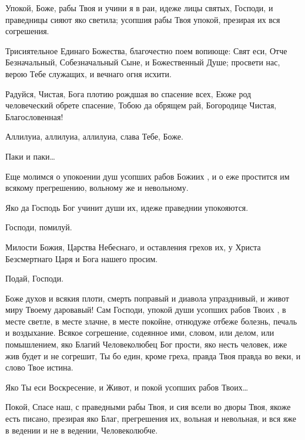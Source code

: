 \begin{mymulticols}

Упокой, Боже, рабы Твоя и учини я в раи, идеже лицы святых, Господи, и праведницы сияют яко светила; усопшия рабы Твоя упокой, презирая их вся согрешения. 

\slava 

Трисиятельное Единаго Божества, благочестно поем вопиюще: Свят еси, Отче Безначальный, Собезначальный Сыне, и Божественный Душе; просвети нас, верою Тебе служащих, и вечнаго огня исхити. 

\inyne 

Радуйся, Чистая, Бога плотию рождшая во спасение всех, Еюже род человеческий обрете спасение, Тобою да обрящем рай, Богородице Чистая, Благословенная! 

Аллилуиа, аллилуиа, аллилуиа, слава Тебе, Боже.  

 Паки и паки… 

Еще молимся о упокоении душ усопших рабов Божиих , и о еже простится им всякому прегрешению, вольному же и невольному. 

 Яко да Господь Бог учинит души их, идеже праведнии упокояются. 

 Господи, помилуй. 

Милости Божия, Царства Небеснаго, и оставления грехов их, у Христа Безсмертнаго Царя и Бога нашего просим. 

 Подай, Господи.


Боже духов и всякия плоти, смерть поправый и диавола упразднивый, и живот миру Твоему даровавый! Сам Господи, упокой души усопших рабов Твоих , в месте светле, в месте злачне, в месте покойне, отнюдуже отбеже болезнь, печаль и воздыхание. Всякое согрешение, содеянное ими, словом, или делом, или помышлением, яко Благий Человеколюбец Бог прости, яко несть человек, иже жив будет и не согрешит, Ты бо един, кроме греха, правда Твоя правда во веки, и слово Твое истина. 

 Яко Ты еси Воскресение, и Живот, и покой усопших рабов Твоих…


Покой, Спасе наш, с праведными рабы Твоя, и сия всели во дворы Твоя, якоже есть писано, презирая яко Благ, прегрешения их, вольная и невольная, и вся яже в ведении и не в ведении, Человеколюбче. 


\end{mymulticols}
